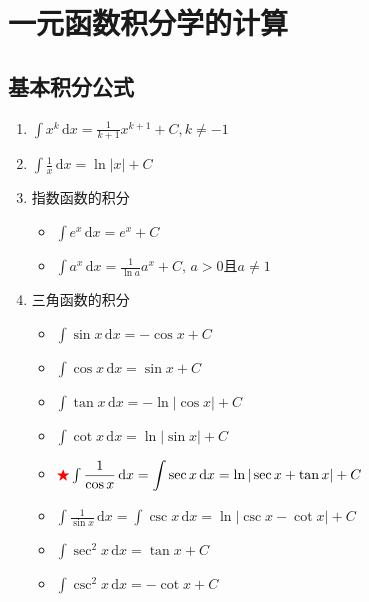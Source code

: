 \documentclass[a4paper,12pt]{article}
\begin{document}



    \section{一元函数积分学的计算}

    \subsection{基本积分公式}

    \begin{enumerate}
        \item $\int x^k\,\mathrm{d}x = \displaystyle\frac{1}{k+1}x^{k+1} + C, k \neq -1$
        \item $\int \displaystyle\frac{1}{x}\,\mathrm{d}x = \ln |x| + C$
        \item 指数函数的积分
        \begin{itemize}
            \item $\int e^x\,\mathrm{d}x = e^x + C$
            \item $\int a^x\,\mathrm{d}x = \displaystyle\frac{1}{\ln a}a^x + C, \,a > 0 \text{且} a \neq 1$
        \end{itemize}
        \item 三角函数的积分
        \begin{itemize}
            \item $\int \sin x\,\mathrm{d}x = -\cos x + C$
            \item $\int \cos x\,\mathrm{d}x = \sin x + C$
            \item $\int \tan x\,\mathrm{d}x = -\ln |\cos x| + C$
            \item $\int \cot x\,\mathrm{d}x = \ln |\sin x| + C$
            \item ${\color{red}{\bigstar}}\int \displaystyle\frac{1}{\cos x}\,\mathrm{d}x = \int \sec x\,\mathrm{d}x = \ln |\sec x + \tan x| + C$
            \item $\int \displaystyle\frac{1}{\sin x}\,\mathrm{d}x = \int \csc x\,\mathrm{d}x = \ln |\csc x - \cot x| + C$
            \item $\int \sec^2 x\,\mathrm{d}x = \tan x + C$
            \item $\int \csc^2 x\,\mathrm{d}x = -\cot x + C$

\end{itemize}
\end{enumerate}
\end{document}
